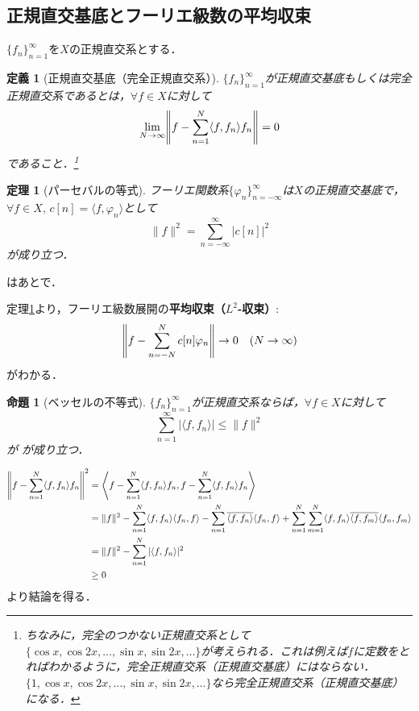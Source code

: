 \documentclass[dvipdfmx,a4j,10pt]{jsarticle}
\makeatletter
\theoremstyle{mystyle1}
\newtheorem{theorem}[definition]{定理}
\newtheorem{proposition}[definition]{命題}
\theoremstyle{mystyle3}
\theoremstyle{mystyle4}
\theoremstyle{mystyle2}
\newtheorem{dfn*}{定義}
\renewenvironment{proof}[1][\proofname]{\par
  \pushQED{\qed}%
  \normalfont
  \topsep6\p@\@plus6\p@ \trivlist
  \item[\hskip\labelsep{\bfseries\sffamily #1}]\ignorespaces
}{%
  \popQED\endtrivlist\@endpefalse
}
\renewcommand\proofname{証明}
\newenvironment{prop}[1][]
{\begin{tcolorbox}[
    enhanced,
    boxrule=0pt,
    arc=0mm,
    frame hidden,
    borderline west={2pt}{-4pt}{blue!50!black},
    breakable = true
    ]
    \begin{proposition}[#1]
}
{\end{proposition}\end{tcolorbox}}
\newenvironment{thm}[1][]
{\begin{tcolorbox}[
    enhanced,
    boxrule=0pt,
    arc=0mm,
    frame hidden,
    borderline west={2pt}{-4pt}{red},
    breakable = true
    ]
    \begin{theorem}[#1]
}
{\end{theorem}\end{tcolorbox}}
\makeatother
\begin{document}
\subsection{正規直交基底とフーリエ級数の平均収束}
$\{f_n\}_{n=1}^\infty$を$X$の正規直交系とする．
\begin{dfn*}[正規直交基底（完全正規直交系）]
    $\{f_n\}_{n=1}^\infty$が正規直交基底もしくは完全正規直交系であるとは，$\forall f\in X$に対して
    \[
        \lim_{N\to\infty} \mleft\|f-\sum_{n=1}^N \langle f,f_n\rangle f_n\mright\|=0
    \]
    であること．\footnote{
        ちなみに，完全のつかない正規直交系として$\{\cos x,\cos 2x,\ldots,\sin x,\sin 2x,\ldots\}$が考えられる．これは例えば$f$に定数をとればわかるように，完全正規直交系（正規直交基底）にはならない．$\{1,\cos x,\cos 2x,\ldots,\sin x,\sin 2x,\ldots\}$なら完全正規直交系（正規直交基底）になる．
    }
\end{dfn*}

\begin{thm}[パーセバルの等式]\label{thm:1-6}
    フーリエ関数系$\{\varphi_n\}_{n=-\infty}^\infty$は$X$の正規直交基底で，$\forall f\in X,\, c[n]=\langle f,\varphi_n\rangle$として
    \begin{equation}\label{eq:1-20}
        \|f\|^2=\sum_{n=-\infty}^\infty |c[n]|^2
    \end{equation}
    が成り立つ．
\end{thm}
\begin{proof}
    はあとで．
\end{proof}

定理\ref{thm:1-6}より，フーリエ級数展開の\textbf{平均収束（$L^2$-収束）}:
\[
    \mleft\|f-\sum_{n=-N}^N c[n]\varphi_n\mright\|\to 0\quad(N\to\infty)
\]
がわかる．

\begin{prop}[ベッセルの不等式]\label{prop:1-7}
    $\{f_n\}_{n=1}^\infty$が正規直交系ならば，$\forall f\in X$に対して
    \begin{equation}\label{eq:1-22}
        \sum_{n=1}^\infty |\langle f,f_n\rangle|\leq \|f\|^2
    \end{equation}が
    が成り立つ．
\end{prop}

\begin{proof}
    \[
        \begin{split}
            \mleft\|f-\sum_{n=1}^N\langle f,f_n\rangle f_n\mright\|^2
            &= \mleft\langle f-\sum_{n=1}^N\langle f,f_n\rangle f_n, f-\sum_{n=1}^N\langle f,f_n\rangle f_n\mright\rangle \\
            &=\|f\|^2-\sum_{n=1}^N\langle f,f_n\rangle\langle f_n,f\rangle-\sum_{n=1}^N\overline{\langle f,f_n\rangle}\langle f_n,f\rangle+\sum_{n=1}^N\sum_{m=1}^N\langle f,f_n\rangle\overline{\langle f,f_m\rangle}\langle f_n,f_m\rangle \\
            &=\|f\|^2-\sum_{n=1}^N|\langle f,f_n\rangle|^2 \\
            &\geq 0
        \end{split}
    \]
    より結論を得る．
\end{proof}
\end{document}
